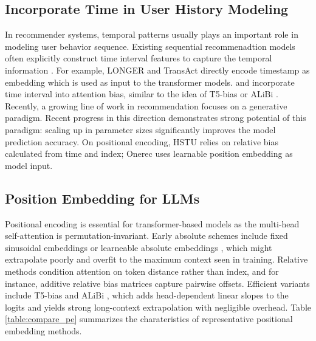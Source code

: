 \documentclass[sigconf]{acmart}
\begin{document}
\subsection{Incorporate Time in User History Modeling}

In recommender systems, temporal patterns usually plays an important role in modeling user behavior sequence. Existing sequential recommenadtion models often explicitly construct time interval features to capture the temporal information \cite{Li2020TimeIA, Chen2022TimeLA, Shirkavand2025CatalogNativeLS, Zhang2022ATS,  Chen2021ExploringPA, Si2024TWINV2}. For example, LONGER \cite{Chai2025LONGER} and TransAct \cite{Xia2023TransActTR} directly encode timestamp as embedding which is used as input to the transformer models. \cite{Si2024TWINV2} and \cite{Li2020TimeIA} incorporate time interval into attention bias, similar to the idea of T5-bias \cite{Raffel2019ExploringTL} or ALiBi \cite{Press2021TrainST}. Recently, a growing line of work in recommendation focuses on a generative paradigm. Recent progress in this direction \cite{Zhai2024ActionsSL, Han2025MTGR, Rajput2023RecommenderSW, Chen2025PinFM, Zhou2025OneRecTR, Shirkavand2025CatalogNativeLS} demonstrates strong potential of this paradigm: scaling up in parameter sizes significantly improves the model prediction accuracy. On positional encoding, HSTU relies on relative bias calculated from time and index; Onerec \cite{Zhou2025OneRecTR} uses learnable position embedding as model input.





\subsection{Position Embedding for LLMs}
Positional encoding is essential for transformer-based models as the multi-head self-attention \cite{Vaswani2017AttentionIA} is permutation-invariant. Early absolute schemes include fixed sinusoidal embeddings \cite{Vaswani2017AttentionIA} or learneable absolute embeddings \cite{Radford2019LanguageMA}, which might extrapolate poorly and overfit to the maximum context seen in training. Relative methods condition attention on token distance rather than index, and for instance, additive relative bias matrices capture pairwise offsets. Efficient variants include T5-bias \cite{Raffel2019ExploringTL} and ALiBi \cite{Press2021TrainST}, which adds head-dependent linear slopes to the logits and yields strong long-context extrapolation with negligible overhead. Table \ref{table:compare_pe} summarizes the charateristics of representative positional embedding methods.
\end{document}
